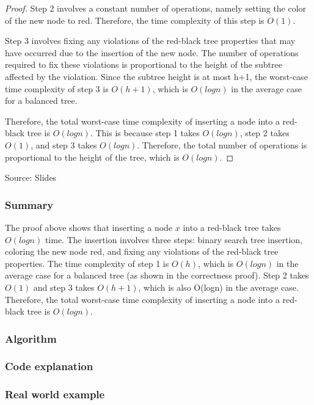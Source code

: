 \documentclass[10pt]{article}
\begin{document}
\begin{proof}
    \spacing
    \noindent
    Step 2 involves a constant number of operations, namely setting the color of
    the new node to red. Therefore, the time complexity of this step is $O(1)$.

    \spacing
    \noindent
    Step 3 involves fixing any violations of the red-black tree properties that
    may have occurred due to the insertion of the new node. The number of operations
    required to fix these violations is proportional to the height of the subtree
    affected by the violation. Since the subtree height is at most h+1, the worst-case
    time complexity of step 3 is $O(h+1)$, which is $O(log n)$ in the average
    case for a balanced tree.

    \spacing
    \noindent
    Therefore, the total worst-case time complexity of inserting a node into a red-black
    tree is $O(log n)$. This is because step 1 takes $O(log n)$, step 2 takes $O(
    1)$, and step 3 takes $O(log n)$. Therefore, the total number of operations
    is proportional to the height of the tree, which is $O(log n)$.
  \end{proof}

  \noindent
  Source: Slides

  \subsubsection*{Summary}


  The proof above shows that inserting a node $x$ into a red-black tree takes $O(
  logn)$ time. The insertion involves three steps: binary search tree insertion,
  coloring the new node red, and fixing any violations of the red-black tree properties.
  The time complexity of step 1 is $O(h)$, which is $O(logn)$ in the average case
  for a balanced tree (as shown in the correctness proof). Step 2 takes $O(1)$
  and step 3 takes $O(h+1)$, which is also O(logn) in the average case. Therefore,
  the total worst-case time complexity of inserting a node into a red-black tree
  is $O(logn)$.

  \subsubsection*{Algorithm}


  \subsubsection*{Code explanation}


  \subsubsection*{Real world example}
\end{document}
